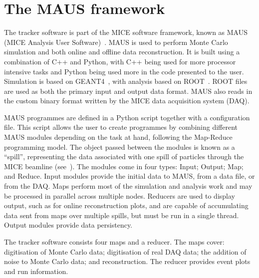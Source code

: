 \section{The MAUS framework}
\label{sec:MAUS}
The tracker software is part of the MICE software framework, known as MAUS (MICE Analysis User Software)~\cite{MausPaper}. MAUS is used to perform Monte Carlo simulation and both online and offline data reconstruction. It is built using a combination of C++ and Python, with C++ being used for more processor intensive tasks and Python being used more in the code presented to the user.  Simulation is based on GEANT4~\cite{GEANT4}, with analysis based on ROOT~\cite{ROOT}.  ROOT files are used as both the primary input and output data format. MAUS also reads in the custom binary format written by the MICE data acquisition system (DAQ). 

MAUS programmes are defined in a Python script together with a configuration file.  This script allows the user to create programmes by combining different MAUS modules depending on the task at hand, following the Map-Reduce programming model\cite{MapReduce}. The object passed between the modules is known as a ``spill'', representing the data associated with one spill of particles through the MICE beamline (see~\cite{MiceBeamline}).  The modules come in four types: Input; Output; Map; and Reduce.  Input modules provide the initial data to MAUS, from a data file, or from the DAQ. Maps perform most of the simulation and analysis work and may be processed in parallel across multiple nodes.  Reducers are used to display output, such as for online reconstruction plots, and are capable of accumulating data sent from maps over multiple spills, but must be run in a single thread. Output modules provide data persistency.

The tracker software consists four maps and a reducer. The maps cover: digitisation of Monte Carlo data; digitisation of real DAQ data; the addition of noise to Monte Carlo data; and reconstruction. The reducer provides event plots and run information.  %